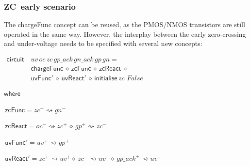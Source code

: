 \documentclass[british,compsoc]{IEEEtran}
\begin{document}
\subsubsection{ZC~early scenario}

The \textsf{chargeFunc} concept can be reused, as the PMOS/NMOS transistors
are still operated in the same way. However, the interplay between
the early zero-crossing and under-voltage needs to be specified with
several new concepts:

\begin{onehalfspace}
\begin{minipage}[t]{1\columnwidth}%

\begin{flushleft}
$\begin{aligned}\mathsf{circuit}&\,uv \,oc \,zc \,gp\_ack \,gn\_ack \,gp \,gn= \\ &\,\mathsf{chargeFunc}\,\diamond\,\mathsf{zcFunc}\,\diamond\,\mathsf{zcReact}\,\diamond\\
& \,\mathsf{uvFunc'}\,\diamond\,\mathsf{uvReact'}\,\diamond\,\mathsf{initialise}\,zc\,\,False
\end{aligned}
$
\par\end{flushleft}%

\begin{flushleft}
$\mathsf{where}$
\end{flushleft}

\begin{flushleft}
$\,\mathsf{zcFunc}=zc^{+}\rightsquigarrow gn^{-}$
\par\end{flushleft}

\begin{flushleft}
$\,\mathsf{zcReact}=oc^{-}\rightsquigarrow zc^{+}\,\diamond\, gp^{+}\rightsquigarrow zc^{-}$
\par\end{flushleft}

\begin{flushleft}
$\,\mathsf{uvFunc'}=uv^{+}\rightsquigarrow gp^{+}$
\par\end{flushleft}

\begin{flushleft}
$\,\mathsf{uvReact'}=zc^{+}\rightsquigarrow uv^{+}\diamond\, zc^{-}\rightsquigarrow uv^{-}\diamond\, gp\_ack^{+}\rightsquigarrow uv^{-}$
\par\end{flushleft}

\end{minipage}
\end{onehalfspace}
\end{document}
